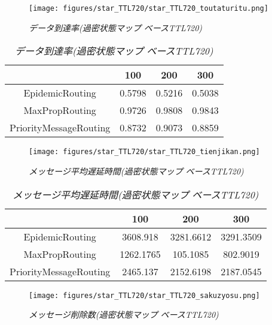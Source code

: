\documentclass[11pt]{icsthesis}
\begin{document}
\begin{figure}[h]
\centering
\texttt{[image: figures/star\_TTL720/star\_TTL720\_toutaturitu.png]}
\caption[]{\it{データ到達率(過密状態マップ ベースTTL720)}}
\label{kamituttl720deliveryprobgraph}
\end{figure}

\begin{table}[H]
 \begin{center}
      \caption[]{\it{データ到達率(過密状態マップ ベースTTL720)}}
      \label{kamituttl720deliveryprob}
      \begin{tabular}{|c|c|c|c|}
\hline
&100&200&300\\
\hline
EpidemicRouting&0.5798&0.5216&0.5038\\
\hline
MaxPropRouting&0.9726&0.9808&0.9843\\
\hline
PriorityMessageRouting&0.8732&0.9073&0.8859\\
\hline
      \end{tabular}
    \end{center}
\end{table}

\newpage

\begin{figure}[h]
\centering
\texttt{[image: figures/star\_TTL720/star\_TTL720\_tienjikan.png]}
\caption[]{\it{メッセージ平均遅延時間(過密状態マップ ベースTTL720)}}
\label{kamituttl720latencyavggraph}
\end{figure}

\begin{table}[H]
	\begin{center}
      \caption[]{\it{メッセージ平均遅延時間(過密状態マップ ベースTTL720)}}
      \label{kamituttl720latencyavg}
      \begin{tabular}{|c|c|c|c|}
				\hline
				&100&200&300\\
				\hline
				EpidemicRouting&3608.918&3281.6612&3291.3509\\
				\hline
				MaxPropRouting&1262.1765&105.1085&802.9019\\
				\hline
				PriorityMessageRouting&2465.137&2152.6198&2187.0545\\
				\hline
			\end{tabular}
			\end{center}
\end{table}

\begin{figure}[h]
\centering
\texttt{[image: figures/star\_TTL720/star\_TTL720\_sakuzyosu.png]}
\caption[]{\it{メッセージ削除数(過密状態マップ ベースTTL720)}}
\label{kamituttl720droppedgraph}
\end{figure}
\end{document}
